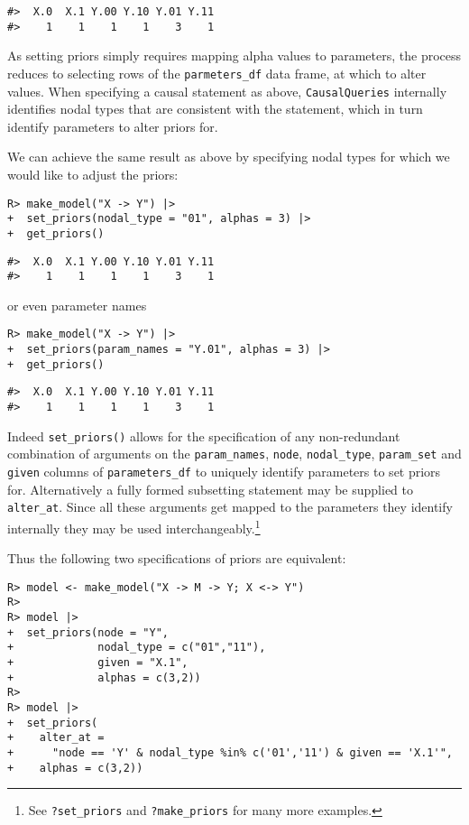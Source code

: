 \documentclass[
  11pt,
  article]{jss}
\begin{document}
\begin{verbatim}
#>  X.0  X.1 Y.00 Y.10 Y.01 Y.11 
#>    1    1    1    1    3    1
\end{verbatim}

As setting priors simply requires mapping alpha values to parameters,
the process reduces to selecting rows of the \texttt{parmeters\_df} data
frame, at which to alter values. When specifying a causal statement as
above, \texttt{CausalQueries} internally identifies nodal types that are
consistent with the statement, which in turn identify parameters to
alter priors for.

We can achieve the same result as above by specifying nodal types for
which we would like to adjust the priors:

\begin{verbatim}
R> make_model("X -> Y") |>
+  set_priors(nodal_type = "01", alphas = 3) |>
+  get_priors()
\end{verbatim}

\begin{verbatim}
#>  X.0  X.1 Y.00 Y.10 Y.01 Y.11 
#>    1    1    1    1    3    1
\end{verbatim}

or even parameter names

\begin{verbatim}
R> make_model("X -> Y") |>
+  set_priors(param_names = "Y.01", alphas = 3) |>
+  get_priors()
\end{verbatim}

\begin{verbatim}
#>  X.0  X.1 Y.00 Y.10 Y.01 Y.11 
#>    1    1    1    1    3    1
\end{verbatim}

Indeed \texttt{set\_priors()} allows for the specification of any
non-redundant combination of arguments on the \texttt{param\_names},
\texttt{node}, \texttt{nodal\_type}, \texttt{param\_set} and
\texttt{given} columns of \texttt{parameters\_df} to uniquely identify
parameters to set priors for. Alternatively a fully formed subsetting
statement may be supplied to \texttt{alter\_at}. Since all these
arguments get mapped to the parameters they identify internally they may
be used interchangeably.\footnote{See \texttt{?set\_priors} and
  \texttt{?make\_priors} for many more examples.}

Thus the following two specifications of priors are equivalent:

\begin{verbatim}
R> model <- make_model("X -> M -> Y; X <-> Y")
R> 
R> model |>
+  set_priors(node = "Y", 
+             nodal_type = c("01","11"), 
+             given = "X.1", 
+             alphas = c(3,2)) 
R> 
R> model |>
+  set_priors(
+    alter_at = 
+      "node == 'Y' & nodal_type %in% c('01','11') & given == 'X.1'", 
+    alphas = c(3,2)) 
\end{verbatim}
\end{document}
